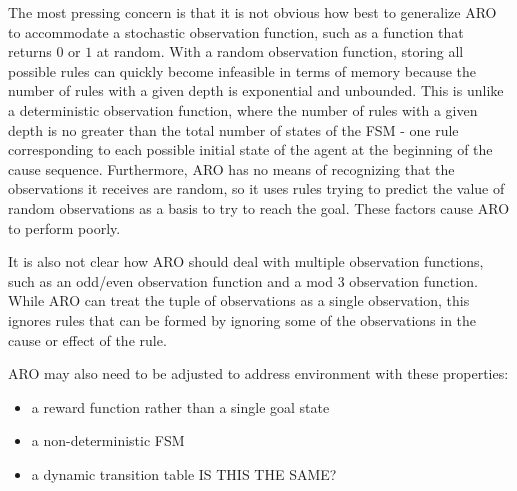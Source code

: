 \documentclass[letterpaper]{article} %
\begin{document}
The most pressing concern is that it is not obvious how best to generalize
ARO to accommodate a stochastic observation function, such as a function that returns $0$ or $1$ at random. With a random observation function, storing all possible rules can quickly become infeasible in terms of memory because the number of rules with a given depth is exponential and unbounded. This is unlike a deterministic observation function, where the number of rules with a given depth is no greater than the total number of states of the FSM - one rule corresponding to each possible initial state of the agent at the beginning of the cause sequence. Furthermore, ARO has no means of recognizing that the observations it receives are random, so it uses rules trying to predict the value of random observations as a basis to try to reach the goal. These factors cause ARO to perform poorly.

It is also not clear how ARO should deal with multiple observation functions, such as an odd/even observation function and a mod 3 observation function. While ARO can treat the tuple of observations as a single observation, this ignores rules that can be formed by ignoring some of the observations in the cause or effect of the rule.

ARO may also need to be adjusted to address environment with these
properties:
\begin{itemize}
\item a reward function rather than a single goal state
\item a non-deterministic FSM
\item a dynamic transition table IS THIS THE SAME?
\end{itemize}

\begin{quote}
\begin{small}


\end{small}
\end{quote}
\end{document}
